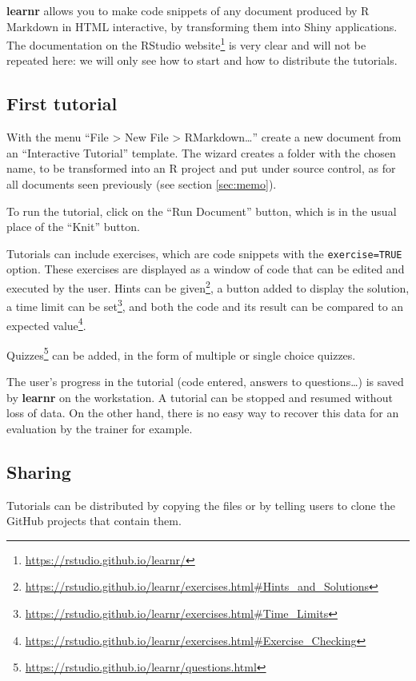 \documentclass[
  12pt,
  american,
  a4paper,
  extrafontsizes,onecolumn,openright
  ]{memoir}
\begin{document}
\textbf{learnr} allows you to make code snippets of any document produced by R Markdown in HTML interactive, by transforming them into Shiny applications.
The documentation on the RStudio website\footnote{\url{https://rstudio.github.io/learnr/}} is very clear and will not be repeated here: we will only see how to start and how to distribute the tutorials.

\subsection{First tutorial}\label{first-tutorial}

With the menu \enquote{File \textgreater{} New File \textgreater{} RMarkdown\ldots{}} create a new document from an \enquote{Interactive Tutorial} template.
The wizard creates a folder with the chosen name, to be transformed into an R project and put under source control, as for all documents seen previously (see section \ref{sec:memo}).

To run the tutorial, click on the \enquote{Run Document} button, which is in the usual place of the \enquote{Knit} button.

Tutorials can include exercises, which are code snippets with the \texttt{exercise=TRUE} option.
These exercises are displayed as a window of code that can be edited and executed by the user.
Hints can be given\footnote{\url{https://rstudio.github.io/learnr/exercises.html\#Hints_and_Solutions}}, a button added to display the solution, a time limit can be set\footnote{\url{https://rstudio.github.io/learnr/exercises.html\#Time_Limits}}, and both the code and its result can be compared to an expected value\footnote{\url{https://rstudio.github.io/learnr/exercises.html\#Exercise_Checking}}.

Quizzes\footnote{\url{https://rstudio.github.io/learnr/questions.html}} can be added, in the form of multiple or single choice quizzes.

The user's progress in the tutorial (code entered, answers to questions\ldots) is saved by \textbf{learnr} on the workstation.
A tutorial can be stopped and resumed without loss of data.
On the other hand, there is no easy way to recover this data for an evaluation by the trainer for example.

\subsection{Sharing}\label{sharing}

Tutorials can be distributed by copying the files or by telling users to clone the GitHub projects that contain them.
\end{document}

